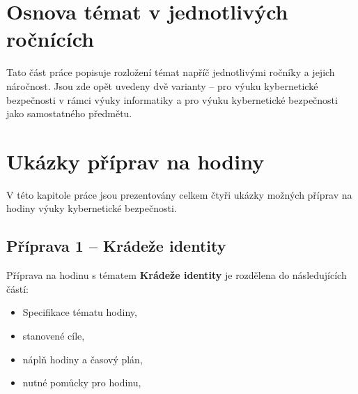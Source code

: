 \documentclass[a4paper, 12pt]{article}
\begin{document}
\newpage
\section{Osnova témat v jednotlivých ročnících}
Tato část práce popisuje rozložení témat napříč jednotlivými ročníky a jejich náročnost. Jsou zde opět uvedeny dvě varianty -- pro výuku kybernetické bezpečnosti v rámci výuky informatiky a pro výuku kybernetické bezpečnosti jako samostatného předmětu.

\newpage
\section{Ukázky příprav na hodiny}
V této kapitole práce jsou prezentovány celkem čtyři ukázky možných příprav na hodiny výuky kybernetické bezpečnosti.

\subsection{Příprava 1 -- Krádeže identity}
Příprava na hodinu s tématem \textbf{Krádeže identity} je rozdělena do následujících částí:
    \begin{itemize}
        \setlength{\itemsep}{-3pt}
        \item Specifikace tématu hodiny,
        \item stanovené cíle,
        \item náplň hodiny a časový plán,
        \item nutné pomůcky pro hodinu,
    \end{itemize}
\end{document}
